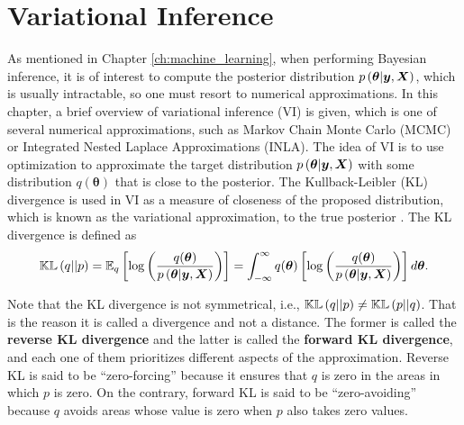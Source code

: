 
\chapter{Variational Inference}
\label{ch:variational_inference}



As mentioned in Chapter \ref{ch:machine_learning}, when performing Bayesian inference, it is of interest to compute the posterior distribution $p\left( \boldsymbol{\theta} | \boldsymbol{y}, \boldsymbol{X} \right)$, which is usually intractable, so one must resort to numerical approximations. In this chapter, a brief overview of variational inference (VI) is given, which is one of several numerical approximations, such as Markov Chain Monte Carlo (MCMC) or Integrated Nested Laplace Approximations (INLA). The idea of VI is to use optimization to approximate the target distribution $p\left( \boldsymbol{\theta} | \boldsymbol{y}, \boldsymbol{X} \right)$ with some distribution $q(\boldsymbol{\theta})$ that is close to the posterior. The Kullback-Leibler (KL) divergence is used in VI as a measure of closeness of the proposed distribution, which is known as the variational approximation, to the true posterior \cite{blei2017variational}. The KL divergence is defined as
\begin{equation}
  \label{eq:kl_divergence}
  \mathbb{KL}\left( q || p \right) = \mathbb{E}_q \left[ \log \left( \frac{q(\boldsymbol{\theta})}{p\left( \boldsymbol{\theta} | \boldsymbol{y}, \boldsymbol{X} \right)} \right) \right] = \int_{-\infty}^{\infty} q(\boldsymbol{\theta}) \left[ \log \left( \frac{q(\boldsymbol{\theta})}{p\left( \boldsymbol{\theta} | \boldsymbol{y}, \boldsymbol{X} \right)} \right) \right] d\boldsymbol{\theta}.
\end{equation}

Note that the KL divergence is not symmetrical, i.e., $\mathbb{KL}\left( q || p \right) \neq \mathbb{KL}\left( p || q \right)$. That is the reason it is called a divergence and not a distance. The former is called the \textbf{reverse KL divergence} and the latter is called the \textbf{forward KL divergence}, and each one of them prioritizes different aspects of the approximation. Reverse KL is said to be ``zero-forcing'' because it ensures that $q$ is zero in the areas in which $p$ is zero. On the contrary, forward KL is said to be ``zero-avoiding'' because $q$ avoids areas whose value is zero when $p$ also takes zero values.

